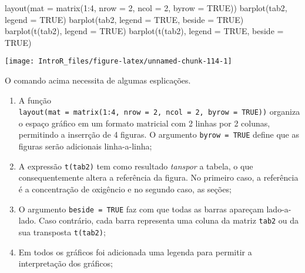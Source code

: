 \documentclass[
]{book}
\newenvironment{Shaded}{\begin{snugshade}}{\end{snugshade}}
\newcommand{\AttributeTok}[1]{\textcolor[rgb]{0.77,0.63,0.00}{#1}}
\newcommand{\ConstantTok}[1]{\textcolor[rgb]{0.00,0.00,0.00}{#1}}
\newcommand{\DecValTok}[1]{\textcolor[rgb]{0.00,0.00,0.81}{#1}}
\newcommand{\FunctionTok}[1]{\textcolor[rgb]{0.00,0.00,0.00}{#1}}
\newcommand{\NormalTok}[1]{#1}
\newcommand{\SpecialCharTok}[1]{\textcolor[rgb]{0.00,0.00,0.00}{#1}}
\begin{document}
\begin{Shaded}
\begin{Highlighting}[]
\FunctionTok{layout}\NormalTok{(}\AttributeTok{mat =} \FunctionTok{matrix}\NormalTok{(}\DecValTok{1}\SpecialCharTok{:}\DecValTok{4}\NormalTok{, }\AttributeTok{nrow =} \DecValTok{2}\NormalTok{, }\AttributeTok{ncol =} \DecValTok{2}\NormalTok{, }\AttributeTok{byrow =} \ConstantTok{TRUE}\NormalTok{))}
\FunctionTok{barplot}\NormalTok{(tab2, }\AttributeTok{legend =} \ConstantTok{TRUE}\NormalTok{)}
\FunctionTok{barplot}\NormalTok{(tab2, }\AttributeTok{legend =} \ConstantTok{TRUE}\NormalTok{, }\AttributeTok{beside =} \ConstantTok{TRUE}\NormalTok{)}
\FunctionTok{barplot}\NormalTok{(}\FunctionTok{t}\NormalTok{(tab2), }\AttributeTok{legend =} \ConstantTok{TRUE}\NormalTok{)}
\FunctionTok{barplot}\NormalTok{(}\FunctionTok{t}\NormalTok{(tab2), }\AttributeTok{legend =} \ConstantTok{TRUE}\NormalTok{, }\AttributeTok{beside =} \ConstantTok{TRUE}\NormalTok{)}
\end{Highlighting}
\end{Shaded}

\begin{center}\texttt{[image: IntroR\_files/figure-latex/unnamed-chunk-114-1]} \end{center}

O comando acima necessita de algumas esplicações.

\begin{enumerate}
\def\labelenumi{\arabic{enumi}.}
\item
  A função \texttt{layout(mat\ =\ matrix(1:4,\ nrow\ =\ 2,\ ncol\ =\ 2,\ byrow\ =\ TRUE))} organiza o espaço gráfico em um formato matricial com 2 linhas por 2 colunas, permitindo a inserrção de 4 figuras. O argumento \texttt{byrow\ =\ TRUE} define que as figuras serão adicionais linha-a-linha;
\item
  A expressão \texttt{t(tab2)} tem como resultado \emph{tanspor} a tabela, o que consequentemente altera a referência da figura. No primeiro caso, a referência é a concentração de oxigêncio e no segundo caso, as seções;
\item
  O argumento \texttt{beside\ =\ TRUE} faz com que todas as barras apareçam lado-a-lado. Caso contrário, cada barra representa uma coluna da matriz \texttt{tab2} ou da sua transposta \texttt{t(tab2)};
\item
  Em todos os gráficos foi adicionada uma legenda para permitir a interpretação dos gráficos;
\end{enumerate}
\end{document}
